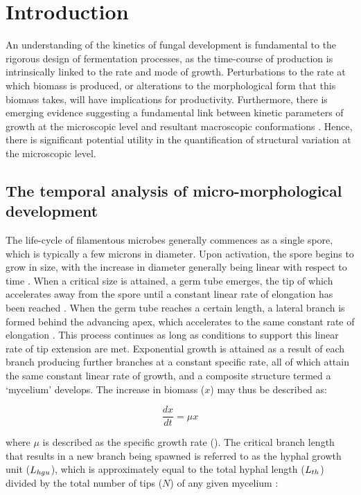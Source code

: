 \section{Introduction}

An understanding of the kinetics of fungal development is fundamental to the rigorous design of fermentation processes, as the time-course of production is intrinsically linked to the rate and mode of growth. Perturbations to the rate at which biomass is produced, or alterations to the morphological form that this biomass takes, will have implications for productivity. Furthermore, there is emerging evidence suggesting a fundamental link between kinetic parameters of growth at the microscopic level and resultant macroscopic conformations \cite{muller2002,muller2003,eypark2006}. Hence, there is significant potential utility in the quantification of structural variation at the microscopic level.

\subsection{The temporal analysis of micro-morphological development}

The life-cycle of filamentous microbes generally commences as a single spore, which is typically a few microns in diameter. Upon activation, the spore begins to grow in size, with the increase in diameter generally being linear with respect to time \cite{spohr1998, carlile2001}. When a critical size is attained, a germ tube emerges, the tip of which accelerates away from the spore until a constant linear rate of elongation has been reached \cite{spohr1998}. When the germ tube reaches a certain length, a lateral branch is formed behind the advancing apex, which accelerates to the same constant rate of elongation \cite{carlile2001}. This process continues as long as conditions to support this linear rate of tip extension are met. Exponential growth is attained as a result of each branch producing further branches at a constant specific rate, all of which attain the same constant linear rate of growth, and a composite structure termed a \lq mycelium' develops. The increase in biomass ($x$) may thus be described as:

\begin{equation}
	\frac{dx}{dt} = \mu x
\end{equation}

\noindent where $\mu$ is described as the specific growth rate (\oh). The critical branch length that results in a new branch being spawned is referred to as the hyphal growth unit ($L_{hgu}$), which is approximately equal to the total hyphal length ($L_{th}$) divided by the total number of tips ($N$) of any given mycelium \cite{plomley1959}:

